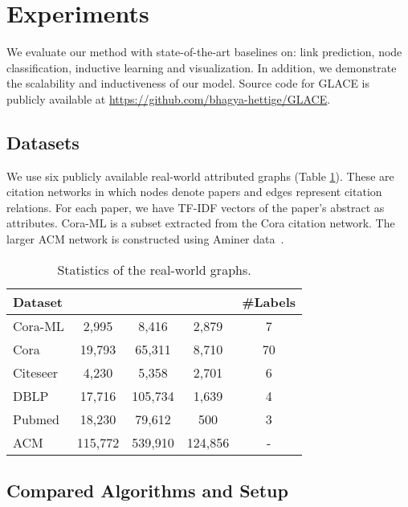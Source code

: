 \documentclass[runningheads]{llncs}
\begin{document}
 \section{Experiments}
\label{sec:experiments}

We evaluate our method with state-of-the-art baselines on: link prediction, node classification, inductive learning and visualization.
In addition, we demonstrate the scalability and inductiveness of our model. 
Source code for GLACE is publicly available at \url{https://github.com/bhagya-hettige/GLACE}.

\subsection{Datasets}

We use six publicly available real-world attributed graphs (Table \ref{tab:homo_data_stat}).
These are citation networks in which nodes denote papers and edges represent citation relations. 
For each paper, we have TF-IDF vectors of the paper's abstract as attributes.
Cora-ML is a subset extracted from the Cora citation network. 
The larger ACM network
is constructed using Aminer data~\cite{aminer_data}. 

\begin{table}[t]
\caption{\small Statistics of the real-world graphs.}
\label{tab:homo_data_stat}
\vspace{-2mm}
\begin{center}
    \small
    \begin{tabular}{|l|c|c|c|c|}
        \hline
        \textbf{Dataset} & \textbf{} &  & \textbf{} & \textbf{\#Labels}\\
        \hline
        Cora-ML & 2,995 & 8,416 & 2,879 & 7 \\
        Cora & 19,793 & 65,311 & 8,710 & 70 \\
        Citeseer & 4,230 & 5,358 & 2,701 & 6 \\
        DBLP & 17,716 & 105,734 & 1,639 & 4 \\
        Pubmed & 18,230 & 79,612 & 500 & 3 \\
        ACM & 115,772 & 539,910 & 124,856 & - \\
        \hline
    \end{tabular}
\end{center}
\vspace{-8mm}
\end{table}

\subsection{Compared Algorithms and Setup}
\end{document}
